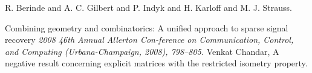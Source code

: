 \documentclass[11pt]{article}
\begin{document}

\begin{thebibliography}{42}
    R. Berinde and A. C. Gilbert and P. Indyk and H. Karloff and M. J. Strauss.
    
    \newblock  Combining geometry and combinatorics: A unified approach to sparse signal recovery
    \newblock  \textit{2008 46th Annual Allerton Con-ference on Communication, Control, and Computing (Urbana-Champaign, 2008), 798–805.}
    Venkat Chandar,
    \newblock A negative result concerning explicit matrices with the restricted isometry property.
    
\end{thebibliography}
\end{document}
